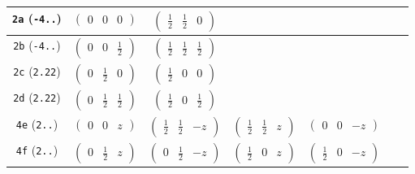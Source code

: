 \documentclass[fleqn,9pt,landscape]{jsarticle}
\begin{document}
\begin{center}
\begin{longtable}{ccccccc}
{\tt 2a} ({\tt -4..}) & $ \begin{pmatrix} 0 & 0 & 0 \end{pmatrix} $ & $ \begin{pmatrix} \frac{1}{2} & \frac{1}{2} & 0 \end{pmatrix} $ & $  $ & $  $ & $  $ & $  $ \\ \hline
{\tt 2b} ({\tt -4..}) & $ \begin{pmatrix} 0 & 0 & \frac{1}{2} \end{pmatrix} $ & $ \begin{pmatrix} \frac{1}{2} & \frac{1}{2} & \frac{1}{2} \end{pmatrix} $ & $  $ & $  $ & $  $ & $  $ \\ \hline
{\tt 2c} ({\tt 2.22}) & $ \begin{pmatrix} 0 & \frac{1}{2} & 0 \end{pmatrix} $ & $ \begin{pmatrix} \frac{1}{2} & 0 & 0 \end{pmatrix} $ & $  $ & $  $ & $  $ & $  $ \\ \hline
{\tt 2d} ({\tt 2.22}) & $ \begin{pmatrix} 0 & \frac{1}{2} & \frac{1}{2} \end{pmatrix} $ & $ \begin{pmatrix} \frac{1}{2} & 0 & \frac{1}{2} \end{pmatrix} $ & $  $ & $  $ & $  $ & $  $ \\ \hline
{\tt 4e} ({\tt 2..}) & $ \begin{pmatrix} 0 & 0 & z \end{pmatrix} $ & $ \begin{pmatrix} \frac{1}{2} & \frac{1}{2} & - z \end{pmatrix} $ & $ \begin{pmatrix} \frac{1}{2} & \frac{1}{2} & z \end{pmatrix} $ & $ \begin{pmatrix} 0 & 0 & - z \end{pmatrix} $ & $  $ & $  $ \\ \hline
{\tt 4f} ({\tt 2..}) & $ \begin{pmatrix} 0 & \frac{1}{2} & z \end{pmatrix} $ & $ \begin{pmatrix} 0 & \frac{1}{2} & - z \end{pmatrix} $ & $ \begin{pmatrix} \frac{1}{2} & 0 & z \end{pmatrix} $ & $ \begin{pmatrix} \frac{1}{2} & 0 & - z \end{pmatrix} $ & $  $ & $  $ \\ \hline

\end{longtable}
\end{center}
\end{document}
